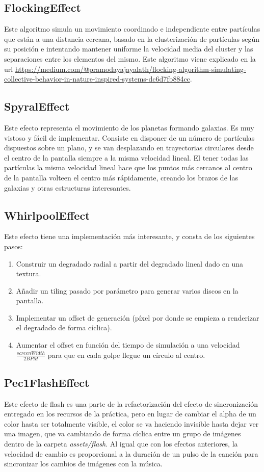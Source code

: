 \documentclass[12pt]{article}%
\begin{document}
\subsection{FlockingEffect}
	Este algoritmo simula un movimiento coordinado e independiente entre partículas que están a una distancia cercana, basado en la clusterización de partículas según su posición e intentando mantener uniforme la velocidad media del cluster y las separaciones entre los elementos del mismo.
	Este algoritmo viene explicado en la url \url{https://medium.com/@pramodayajayalath/flocking-algorithm-simulating-collective-behavior-in-nature-inspired-systems-dc6d7fb884cc}.
	
\subsection{SpyralEffect}
	Este efecto representa el movimiento de los planetas formando galaxias. Es muy vistoso y fácil de implementar. Consiste en disponer de un número de partículas dispuestos sobre un plano, y se van desplazando en trayectorias circulares desde el centro de la pantalla siempre a la misma velocidad lineal. El tener todas las partículas la misma velocidad lineal hace que los puntos más cercanos al centro de la pantalla volteen el centro más rápidamente, creando los brazos de las galaxias y otras estructuras interesantes. 

\subsection{WhirlpoolEffect}
	Este efecto tiene una implementación más interesante, y consta de los siguientes pasos:
	\begin{enumerate}
		\item Construir un degradado radial a partir del degradado lineal dado en una textura.
		\item Añadir un tiling pasado por parámetro para generar varios discos en la pantalla.
		\item Implementar un offset de generación (píxel por donde se empieza a renderizar el degradado de forma cíclica).
		\item Aumentar el offset en función del tiempo de simulación a una velocidad $\frac{screenWidth}{2BPM}$ para que en cada golpe llegue un círculo al centro.
	\end{enumerate}

\subsection{Pec1FlashEffect}
	Este efecto de flash es una parte de la refactorización del efecto de sincronización entregado en los recursos de la práctica, pero en lugar de cambiar el alpha de un color hasta ser totalmente visible, el color se va haciendo invisible hasta dejar ver una imagen, que va cambiando de forma cíclica entre un grupo de imágenes dentro de la carpeta \textit{assets/flash}. Al igual que con los efectos anteriores, la velocidad de cambio es proporcional a la duración de un pulso de la canción para sincronizar los cambios de imágenes con la música.
\end{document}
